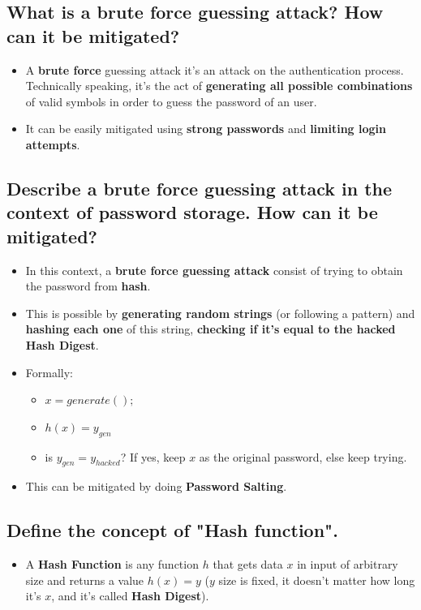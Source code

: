 \documentclass[9pt, letterpaper]{article}
\begin{document}
\subsection{What is a brute force guessing attack? How can it be mitigated?}
\begin{itemize}
	\item A \textbf{brute force} guessing attack it's an attack on the authentication process. Technically speaking, it's the act of \textbf{generating all possible combinations} of valid symbols in order to guess the password of an user.
	\item It can be easily mitigated using \textbf{strong passwords} and \textbf{limiting login attempts}.
\end{itemize}

\subsection{Describe a brute force guessing attack in the context of password storage. How can it be mitigated?}
\begin{itemize}
	\item In this context, a \textbf{brute force guessing attack} consist of trying to obtain the password from \textbf{hash}.
	\item This is possible by \textbf{generating random strings} (or following a pattern) and \textbf{hashing each one} of this string, \textbf{checking if it's equal to the hacked Hash Digest}.
	\item Formally:
	      \begin{itemize}
		      \item $x= generate(); $
		      \item $h(x)=y_{gen}$
		      \item is $y_{gen}= y_{hacked}$? If yes, keep $x$ as the original password, else keep trying.
	      \end{itemize}
	\item This can be mitigated by doing \textbf{Password Salting}.
\end{itemize}

\subsection{Define the concept of "Hash function".}
\begin{itemize}
	\item A \textbf{Hash Function} is any function $h$ that gets data $x$ in input of arbitrary size and returns a value $h(x)=y$ ($y$ size is fixed, it doesn't matter how long it's $x$, and it's called \textbf{Hash Digest}).
\end{itemize}
\end{document}
